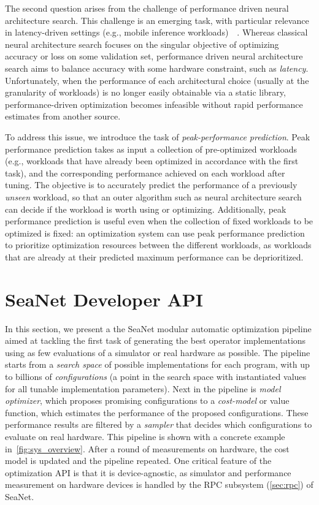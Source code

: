 The second question arises from the challenge of performance driven neural architecture search.
This challenge is an emerging task, with particular relevance in latency-driven settings (e.g., mobile inference workloads)~\cite{tan2019mnasnet}~\cite{2018arXiv181200332C}.
Whereas classical neural architecture search focuses on the singular objective of optimizing accuracy or loss on some validation set, performance driven neural architecture search aims to balance accuracy with some hardware constraint, such as \emph{latency}.
Unfortunately, when the performance of each architectural choice (usually at the granularity of workloads) is no longer easily obtainable via a static library, performance-driven optimization becomes infeasible without rapid performance estimates from another source.

To address this issue, we introduce the task of \emph{peak-performance prediction}.
Peak performance prediction takes as input a collection of pre-optimized workloads (e.g., workloads that have already been optimized in accordance with the first task), and the corresponding performance achieved on each workload after tuning.
The objective is to accurately predict the performance of a previously \emph{unseen} workload, so that an outer algorithm such as neural architecture search can decide if the workload is worth using or optimizing.
Additionally, peak performance prediction is useful even when the collection of fixed workloads to be optimized is fixed: an optimization system can use peak performance prediction to prioritize optimization resources between the different workloads, as workloads that are already at their predicted maximum performance can be deprioritized.

\section{SeaNet Developer API}
In this section, we present a the SeaNet modular automatic optimization pipeline aimed at tackling the first task of generating the best operator implementations using as few evaluations of a simulator or real hardware as possible.
The pipeline starts from a \emph{search space} of possible implementations for each program, with up to billions of \emph{configurations} (a point in the search space with instantiated values for all tunable implementation parameters).
Next in the pipeline is \emph{model optimizer}, which proposes promising configurations to a \emph{cost-model} or value function, which estimates the performance of the proposed configurations.
These performance results are filtered by a \emph{sampler} that  decides which configurations to evaluate on real hardware. This pipeline is shown with a concrete example in~\autoref{fig:sys_overview}.
After a round of measurements on hardware, the cost model is updated and the pipeline repeated.
One critical feature of the optimization API is that it is device-agnostic, as simulator and performance measurement on hardware devices is handled by the RPC subsystem (\autoref{sec:rpc}) of SeaNet.


